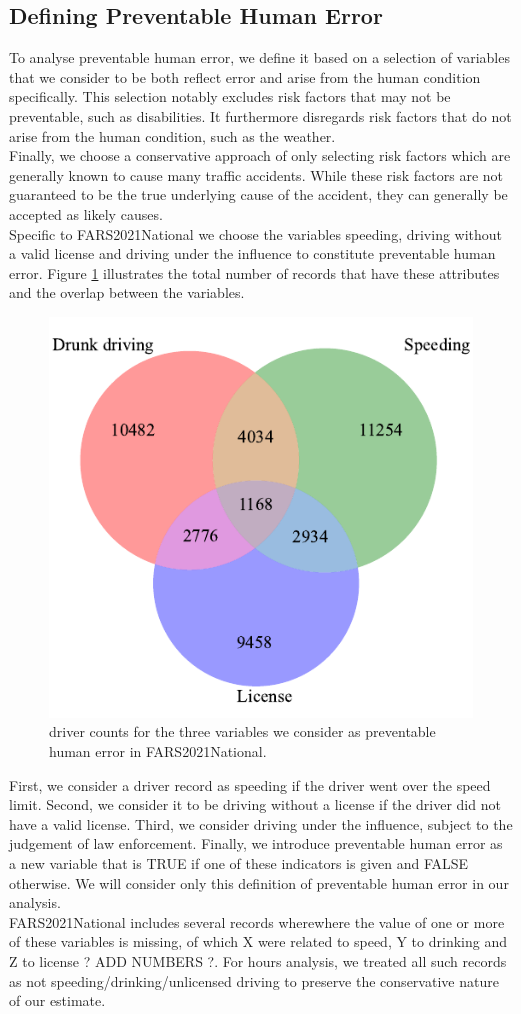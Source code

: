 \documentclass{article}
\theoremstyle{plain}
\theoremstyle{definition}
\theoremstyle{remark}
\begin{document}
\subsection{Defining Preventable Human Error}
To analyse preventable human error, we define it based on a selection of variables that we consider to be both reflect error and arise from the human condition specifically. This selection notably excludes risk factors that may not be preventable, such as disabilities. It furthermore disregards risk factors that do not arise from the human condition, such as the weather.\\
Finally, we choose a conservative approach of only selecting risk factors which are generally known to cause many traffic accidents. While these risk factors are not guaranteed to be the true underlying cause of the accident, they can generally be accepted as likely causes.
\\
Specific to FARS2021National we choose the variables speeding, driving without a valid license and driving under the influence to constitute preventable human error. Figure \ref{fig:drivers-err-overlap} illustrates the total number of records that have these attributes and the overlap between the variables.\\
\begin{figure}[ht]
	\vskip 0.2in
	\begin{center}
		\centerline{\includegraphics[width=0.49\columnwidth]{plots/drivers-err-overlap}}
		\caption{driver counts for the three variables we consider as preventable human error in FARS2021National.}
		\label{fig:drivers-err-overlap}
	\end{center}
	\vskip -0.2in
\end{figure}
First, we consider a driver record as speeding if the driver went over the speed limit. Second, we consider it to be driving without a license if the driver did not have a valid license. Third, we consider driving under the influence, subject to the judgement of law enforcement. Finally, we introduce preventable human error as a new variable that is TRUE if one of these indicators is given and FALSE otherwise. We will consider only this definition of preventable human error in our analysis.
\\
FARS2021National includes several records wherewhere the value of one or more of these variables is missing, of which X were related to speed, Y to drinking and Z to license ? ADD NUMBERS ?. For hours analysis, we treated all such records as not speeding/drinking/unlicensed driving to preserve the conservative nature of our estimate.
\end{document}

